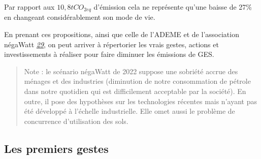 Par rapport aux \(10,8 tCO_{2eq}\) d'émission cela ne représente qu'une
baisse de 27\% en changeant considérablement son mode de vie.

En prenant ces propositions, ainsi que celle de l'ADEME et de
l'association négaWatt
\emph{\href{https://negawatt.org/IMG/pdf/synthese-scenario-negawatt-2022.pdf}{29}},
on peut arriver à répertorier les vrais gestes, actions et
investissements à réaliser pour faire diminuer les émissions de GES.

\begin{quote}
Note : le scénario négaWatt de 2022 suppose une sobriété accrue des
ménages et des industries (diminution de notre consommation de pétrole
dans notre quotidien qui est difficilement acceptable par la société).
En outre, il pose des hypothèses sur les technologies récentes mais
n'ayant pas été développé à l'échelle industrielle. Elle omet aussi le
problème de concurrence d'utilisation des sols.
\end{quote}

\hypertarget{les-premiers-gestes}{%
\subsection{Les premiers gestes}\label{les-premiers-gestes}}

